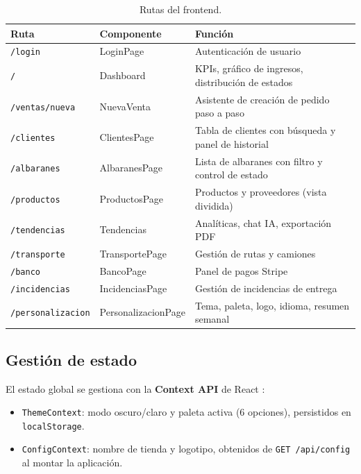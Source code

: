 \documentclass[12pt,twoside,titlepage]{report}
\begin{document}
\begin{table}[H]
  \centering
  \caption{Rutas del frontend.}
  \label{tab:rutas}
  \begin{tabular}{ll>{\raggedright\arraybackslash}p{6.5cm}}
    \toprule
    \textbf{Ruta} & \textbf{Componente} & \textbf{Función} \\
    \midrule
    \texttt{/login}          & LoginPage           & Autenticación de usuario \\
    \texttt{/}               & Dashboard           & KPIs, gráfico de ingresos, distribución de estados \\
    \texttt{/ventas/nueva}   & NuevaVenta          & Asistente de creación de pedido paso a paso \\
    \texttt{/clientes}       & ClientesPage        & Tabla de clientes con búsqueda y panel de historial \\
    \texttt{/albaranes}      & AlbaranesPage       & Lista de albaranes con filtro y control de estado \\
    \texttt{/productos}      & ProductosPage       & Productos y proveedores (vista dividida) \\
    \texttt{/tendencias}     & Tendencias          & Analíticas, chat IA, exportación PDF \\
    \texttt{/transporte}     & TransportePage      & Gestión de rutas y camiones \\
    \texttt{/banco}          & BancoPage           & Panel de pagos Stripe \\
    \texttt{/incidencias}    & IncidenciasPage     & Gestión de incidencias de entrega \\
    \texttt{/personalizacion}& PersonalizacionPage & Tema, paleta, logo, idioma, resumen semanal \\
    \bottomrule
  \end{tabular}
\end{table}

\subsection{Gestión de estado}

El estado global se gestiona con la \textbf{Context API} de React \cite{react}:

\begin{itemize}[nosep]
  \item \texttt{ThemeContext}: modo oscuro/claro y paleta activa (6 opciones), persistidos en \texttt{localStorage}.
  \item \texttt{ConfigContext}: nombre de tienda y logotipo, obtenidos de \texttt{GET /api/config} al montar la aplicación.
\end{itemize}
\end{document}
